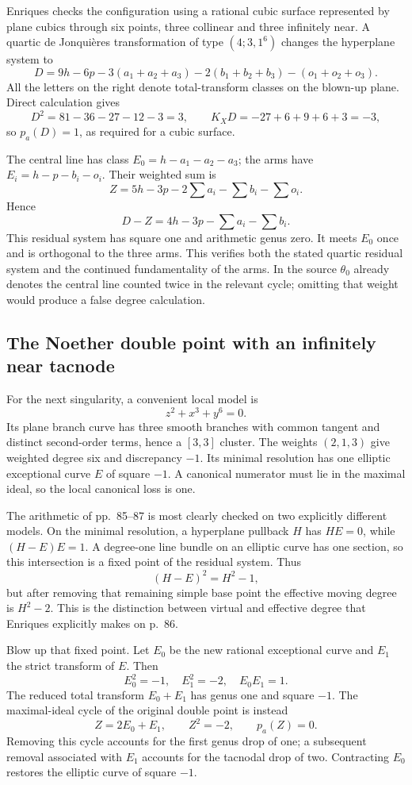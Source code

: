 Enriques checks the configuration using a rational cubic surface represented by plane cubics through six points, three collinear and three infinitely near. A quartic de Jonquières transformation of type \((4;3,1^6)\) changes the hyperplane system to \[
D=9h-6p-3(a_1+a_2+a_3)-2(b_1+b_2+b_3)-(o_1+o_2+o_3).
\] All the letters on the right denote total-transform classes on the blown-up plane. Direct calculation gives \[
D^2=81-36-27-12-3=3,\qquad K_XD=-27+6+9+6+3=-3,
\] so \(p_a(D)=1\), as required for a cubic surface.

The central line has class \(E_0=h-a_1-a_2-a_3\); the arms have \(E_i=h-p-b_i-o_i\). Their weighted sum is \[
Z=5h-3p-2\sum a_i-\sum b_i-\sum o_i.
\] Hence \[
D-Z=4h-3p-\sum a_i-\sum b_i.
\] This residual system has square one and arithmetic genus zero. It meets \(E_0\) once and is orthogonal to the three arms. This verifies both the stated quartic residual system and the continued fundamentality of the arms. In the source \(\theta_0\) already denotes the central line counted twice in the relevant cycle; omitting that weight would produce a false degree calculation.

\subsection{The Noether double point with an infinitely near tacnode}

For the next singularity, a convenient local model is \[
z^2+x^3+y^6=0.
\tag{III.8}
\] Its plane branch curve has three smooth branches with common tangent and distinct second-order terms, hence a \([3,3]\) cluster. The weights \((2,1,3)\) give weighted degree six and discrepancy \(-1\). Its minimal resolution has one elliptic exceptional curve \(E\) of square \(-1\). A canonical numerator must lie in the maximal ideal, so the local canonical loss is one.

The arithmetic of pp.~85--87 is most clearly checked on two explicitly different models. On the minimal resolution, a hyperplane pullback \(H\) has \(HE=0\), while \((H-E)E=1\). A degree-one line bundle on an elliptic curve has one section, so this intersection is a fixed point of the residual system. Thus \[
(H-E)^2=H^2-1,
\] but after removing that remaining simple base point the effective moving degree is \(H^2-2\). This is the distinction between virtual and effective degree that Enriques explicitly makes on p.~86.

Blow up that fixed point. Let \(E_0\) be the new rational exceptional curve and \(E_1\) the strict transform of \(E\). Then \[
E_0^2=-1,\quad E_1^2=-2,\quad E_0E_1=1.
\] The reduced total transform \(E_0+E_1\) has genus one and square \(-1\). The maximal-ideal cycle of the original double point is instead \[
Z=2E_0+E_1,\qquad Z^2=-2,\qquad p_a(Z)=0.
\] Removing this cycle accounts for the first genus drop of one; a subsequent removal associated with \(E_1\) accounts for the tacnodal drop of two. Contracting \(E_0\) restores the elliptic curve of square \(-1\).

